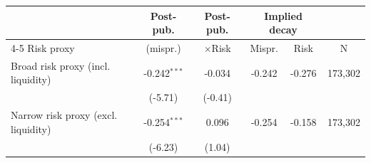 \begin{tabular}{lccccc}
\toprule
 & Post-pub. & Post-pub. & \multicolumn{2}{c}{Implied decay} & \\
\cmidrule(lr){4-5}
Risk proxy & (mispr.) & $\times$Risk & Mispr. & Risk & N \\
\midrule
Broad risk proxy (incl. liquidity) & -0.242$^{***}$ & -0.034 & -0.242 & -0.276 & 173,302 \\
 & (-5.71) & (-0.41) & & & \\
Narrow risk proxy (excl. liquidity) & -0.254$^{***}$ & 0.096 & -0.254 & -0.158 & 173,302 \\
 & (-6.23) & (1.04) & & & \\
\bottomrule
\end{tabular}